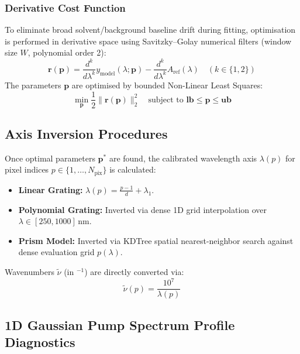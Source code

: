 \subsubsection{Derivative Cost Function}
To eliminate broad solvent/background baseline drift during fitting, optimisation is performed in derivative space using Savitzky--Golay numerical filters (window size $W$, polynomial order 2):
\begin{equation}\label{eq:residuals}
  \mathbf{r}(\mathbf{p}) = \frac{d^k}{d\lambda^k} y_\text{model}(\lambda; \mathbf{p}) - \frac{d^k}{d\lambda^k} A_\text{ref}(\lambda) \quad (k \in \{1, 2\})
\end{equation}
The parameters $\mathbf{p}$ are optimised by bounded Non-Linear Least Squares:
\begin{equation}\label{eq:least_squares}
  \min_{\mathbf{p}} \frac{1}{2} \|\mathbf{r}(\mathbf{p})\|_2^2 \quad \text{subject to } \mathbf{lb} \le \mathbf{p} \le \mathbf{ub}
\end{equation}

\subsection{Axis Inversion Procedures}

Once optimal parameters $\mathbf{p}^*$ are found, the calibrated wavelength axis $\lambda(p)$ for pixel indices $p \in \{1, \dots, N_\text{pix}\}$ is calculated:

\begin{itemize}
  \item \textbf{Linear Grating:} $\lambda(p) = \frac{p - 1}{d} + \lambda_1$.
  \item \textbf{Polynomial Grating:} Inverted via dense 1D grid interpolation over $\lambda \in [250, 1000]$\,nm.
  \item \textbf{Prism Model:} Inverted via KDTree spatial nearest-neighbor search against dense evaluation grid $p(\lambda)$.
\end{itemize}

Wavenumbers $\tilde{\nu}$ (in $^{-1}$) are directly converted via:
\begin{equation}
  \tilde{\nu}(p) = \frac{10^7}{\lambda(p)}
\end{equation}

\subsection{1D Gaussian Pump Spectrum Profile Diagnostics}

